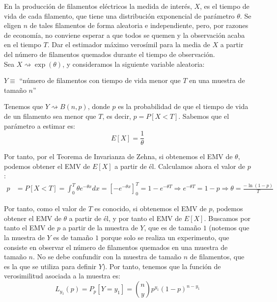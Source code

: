 \begin{ejercicio}
    En la producción de filamentos eléctricos la medida de interés, $X$, es el tiempo de vida de cada filamento, que tiene una distribución exponencial de parámetro $\theta$. Se eligen $n$ de tales filamentos de forma aleatoria e independiente, pero, por razones de economía, no conviene esperar a que todos se quemen y la observación acaba en el tiempo $T$. Dar el estimador máximo verosímil para la media de $X$ a partir del número de filamentos quemados durante el tiempo de observación.\\


    Sea $X\rightsquigarrow \exp(\theta)$, y consideramos la siguiente variable aleatoria:
    \begin{center}
        $Y\equiv$ ``número de filamentos con tiempo de vida menor que $T$ en una muestra de tamaño $n$''
    \end{center}

    Tenemos que $Y\rightsquigarrow B(n,p)$, donde $p$ es la probabilidad de que el tiempo de vida de un filamento sea menor que $T$, es decir, $p = P[X<T]$. Sabemos que el parámetro a estimar es:
    \begin{equation*}
        E[X] = \frac{1}{\theta}
    \end{equation*}

    Por tanto, por el Teorema de Invarianza de Zehna, si obtenemos el EMV de $\theta$, podemos obtener el EMV de $E[X]$ a partir de él. Calculamos ahora el valor de $p$:
    \begin{align*}
        p &= P[X<T] = \int_{0}^{T}\theta e^{-\theta x}dx = \left[-e^{-\theta x}\right]_{0}^{T} = 1 - e^{-\theta T}
        \Longrightarrow
        e^{-\theta T} = 1-p \Longrightarrow \theta = \frac{-\ln(1-p)}{T}
    \end{align*}

    Por tanto, como el valor de $T$ es conocido, si obtenemos el EMV de $p$, podemos obtener el EMV de $\theta$ a partir de él, y por tanto el EMV de $E[X]$. Buscamos por tanto el EMV de $p$ a partir de la muestra de $Y$, que es de tamaño $1$ (notemos que la muestra de $Y$ es de tamaño $1$ porque solo se realiza un experimento, que consiste en observar el número de filamentos quemados en una muestra de tamaño $n$. No se debe confundir con la muestra de tamaño $n$ de filamentos, que es la que se utiliza para definir $Y$). Por tanto, tenemos que la función de verosimilitud asociada a la muestra es:
    \begin{equation*}
        L_{y_1}(p) = P_p[Y=y_1] = \binom{n}{y}p^{y_1}{(1-p)}^{n-{y_1}}
    \end{equation*}


\end{ejercicio}

